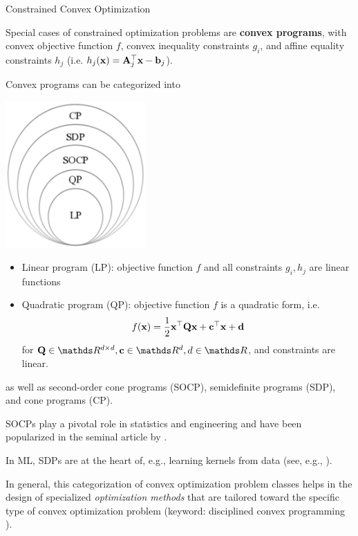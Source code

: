 \documentclass[11pt,compress,t,notes=noshow, xcolor=table]{beamer}
\begin{document}
\begin{vbframe}{Constrained Convex Optimization}

Special cases of constrained optimization problems are \textbf{convex programs}, with convex objective function $f$, convex inequality constraints $g_i$, and affine equality constraints $h_j$ (i.e. $h_j(\mathbf{x}) = \mathbf{A}_j^\top \mathbf{x} - \mathbf{b}_j$). 

\lz 

Convex programs can be categorized into 

\begin{center}
\includegraphics[width=0.4\textwidth]{figure_man/convex_programs.png}
\end{center}

\lz 

\begin{itemize}
	\item Linear program (LP): objective function $f$ and all constraints $g_i, h_j$ are linear functions
	\item Quadratic program (QP): objective function $f$ is a quadratic form, i.e. $$
	f(\mathbf{x}) = \frac{1}{2}\mathbf{x}^\top \mathbf{Q} \mathbf{x} + \mathbf{c}^\top \mathbf{x} + \mathbf{d} 
$$
for $\mathbf{Q} \in \R^{d \times d}, \mathbf{c} \in \R^d, d \in \R$, and constraints are linear.
\end{itemize}

as well as second-order cone programs (SOCP), semidefinite programs (SDP), and cone programs (CP). 

\framebreak


SOCPs play a pivotal role in statistics and engineering and have been popularized in the seminal article by \href{http://www.seas.ucla.edu/~vandenbe/publications/socp.pdf}{}. 
\lz 

In ML, SDPs are at the heart of, e.g., learning kernels from data (see, e.g., \href{https://www.jmlr.org/papers/volume5/lanckriet04a/lanckriet04a.pdf}{}).

\lz 

In general, this categorization of convex optimization problem classes helps in the design of specialized \emph{optimization methods} that are tailored toward the specific type of convex optimization problem (keyword: disciplined convex programming \href{https://web.stanford.edu/~boyd/papers/disc_cvx_prog.html}{}).

\end{vbframe}

\endlecture
\end{document}
